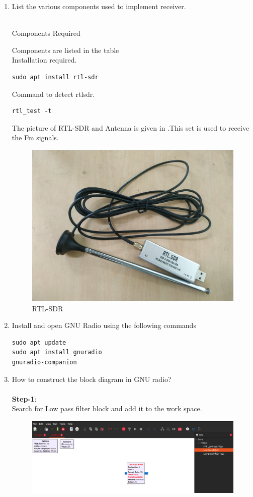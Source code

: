 \begin{enumerate}[label=\arabic*.,ref=\thesection.\theenumi]
\item List the various components used to implement receiver.
\\
\solution
\\
\begin{table}[!ht]
  \centering
  
  \caption{Components Required}
  \label{tab:rxcomponents}
\end{table}
Components are listed in the table \\
Installation required.\\
\begin{lstlisting}
sudo apt install rtl-sdr
\end{lstlisting}
Command to detect rtlsdr.\\
\begin{lstlisting}
rtl_test -t
\end{lstlisting}
The picture of RTL-SDR and Antenna is given in .This set is used to receive the Fm signals.
\begin{figure}[H]
\centering
\includegraphics[width=0.5\columnwidth]{fm/rx/figs/rtl-sdr.png}
\caption{RTL-SDR}
\label{fig:rtl-sdr}
\end{figure}
\item Install and open GNU Radio using the following commands
\\
\begin{lstlisting}
sudo apt update
sudo apt install gnuradio
gnuradio-companion
\end{lstlisting}
\item How to construct the block diagram in GNU radio? \\
	\solution  \\
\textbf{Step-1}:\\
Search for Low pass filter block and add it to the work space.
\begin{figure}[H]
\centering
\includegraphics[width=\columnwidth]{fm/rx/figs/add.png}

\end{figure}
\end{enumerate}
